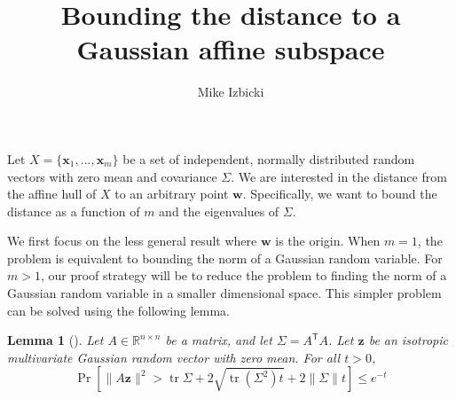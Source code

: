 \documentclass{article}
\title{Bounding the distance to a Gaussian affine subspace}
\author{Mike Izbicki}
\newtheorem{lemma}{Lemma}
\theoremstyle{definition}
\DeclareMathOperator*{\affspan}{aff}
\DeclareMathOperator*{\argmin}{arg\,min}
\DeclareMathOperator*{\tr}{tr}
\DeclareMathOperator*{\probop}{Pr}
\newcommand{\prob}[1]{\ensuremath{\probop\left[{#1}\right]}}
\newcommand{\proj}[1]{\ensuremath{\pi}_{#1}}
\newcommand{\ltwo}[1]{\lVert{#1}\rVert}
\newcommand{\trans}[1]{\ensuremath{{#1}^{\mathsf{T}}}}
\newcommand{\comp}[1]{\ensuremath{{#1}^\bot}}
\newcommand{\w}{\mathbf{w}}
\newcommand{\x}{\mathbf{x}}
\newcommand{\y}{\mathbf{y}}
\newcommand{\z}{\mathbf{z}}
\begin{document}
\maketitle

Let $X=\{\x_1,...,\x_m\}$ be a set of independent, normally distributed random vectors with zero mean and covariance $\Sigma$.
We are interested in the distance from the affine hull of $X$ to an arbitrary point $\w$.
Specifically, we want to bound the distance as a function of $m$ and the eigenvalues of $\Sigma$.

We first focus on the less general result where $\w$ is the origin.
When $m=1$, the problem is equivalent to bounding the norm of a Gaussian random variable.
For $m>1$, our proof strategy will be to reduce the problem to finding the norm of a Gaussian random variable in a smaller dimensional space.
This simpler problem can be solved using the following lemma.
\begin{lemma}[\cite{hsu2012tail}]
\label{lemma:hsu}
Let $A \in \mathbb{R}^{n\times n}$ be a matrix,
and let $\Sigma = \trans A A$.
Let $\z$ be an isotropic multivariate Gaussian random vector with zero mean.
For all $t>0$,
\begin{equation}
\prob{\ltwo{A\z}^2 > \tr{\Sigma} + 2\sqrt{\tr (\Sigma^2)t} + 2\ltwo{\Sigma}t} \le e^{-t}
\end{equation}
\end{lemma}


\end{document}
